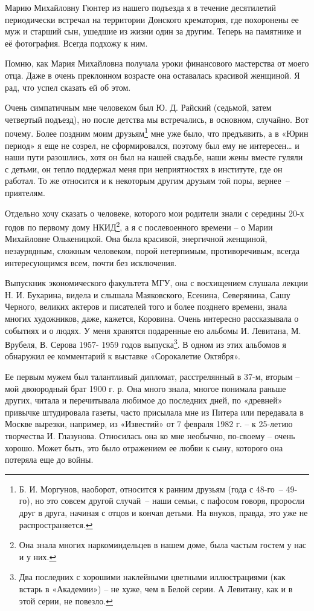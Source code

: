 Марию Михайловну Гюнтер из нашего подъезда я в течение десятилетий периодически встречал на территории Донского крематория, где похоронены ее муж и старший сын, ушедшие из жизни один за другим. Теперь на памятнике и её фотография. Всегда подхожу к ним.

Помню, как Мария Михайловна получала уроки финансового мастерства от моего отца. Даже в очень преклонном возрасте она оставалась красивой женщиной. Я рад, что успел сказать ей об этом.
    
Очень симпатичным мне человеком был Ю. Д. Райский (седьмой, затем четвертый подъезд), но после детства мы встречались, в  основном, случайно. Вот почему. Более поздним моим друзьям\protect\footnote{Б. И. Моргунов, наоборот, относится к ранним друзьям (года с 48-го~-- 49-го), но это совсем другой случай~-- наши семьи, с пафосом говоря, проросли друг в друга, начиная с отцов и кончая детьми. На внуков, правда, это уже не распространяется.}  мне уже было, что предъявить, а в «Юрин период» я еще не созрел, не сформировался, поэтому был ему не интересен… и наши пути разошлись, хотя он был на нашей свадьбе, наши жены вместе гуляли с детьми, он тепло поддержал меня при неприятностях в институте, где он работал. То же относится и к некоторым другим друзьям той поры, вернее~-- приятелям.


Отдельно хочу сказать о человеке, которого мои родители знали с середины 20-х годов по первому дому НКИД\protect\footnote{Она знала многих наркоминдельцев в нашем доме, была частым гостем у нас и у них.}, а я с послевоенного времени – о Марии Михайловне Олькеницкой. Она была красивой, энергичной женщиной, незаурядным, сложным человеком, порой нетерпимым, противоречивым, всегда интересующимся всем, почти без исключения.
 
Выпускник экономического факультета МГУ, она с восхищением слушала лекции Н. И. Бухарина, видела и слышала Маяковского, Есенина, Северянина, Сашу Черного, великих актеров и писателей того и более позднего времени, знала многих художников, даже, кажется, Коровина. Очень интересно рассказывала о событиях и о людях. У меня хранятся подаренные ею альбомы И. Левитана, М. Врубеля, В. Серова  1957- 1959 годов выпуска\protect\footnote{Два последних с хорошими наклейными цветными иллюстрациями (как встарь в «Академии») – не хуже, чем в Белой серии. А Левитану, как и в этой серии, не повезло.}. В одном из этих альбомов я обнаружил ее комментарий к выставке «Сорокалетие Октября».  

Ее первым мужем был талантливый дипломат, расстрелянный в 37-м, вторым – мой двоюродный брат 1900 г. р. Она много знала, многое понимала раньше других, читала и перечитывала любимое до последних дней, по «древней» привычке штудировала газеты, часто присылала мне из Питера или передавала в Москве  вырезки, например,  из «Известий» от 7 февраля 1982 г.  – к 25-летию творчества И. Глазунова.
Относилась она ко мне необычно,  по-своему – очень хорошо. Может быть, это было отражением ее любви к сыну, которого она потеряла еще до войны.

